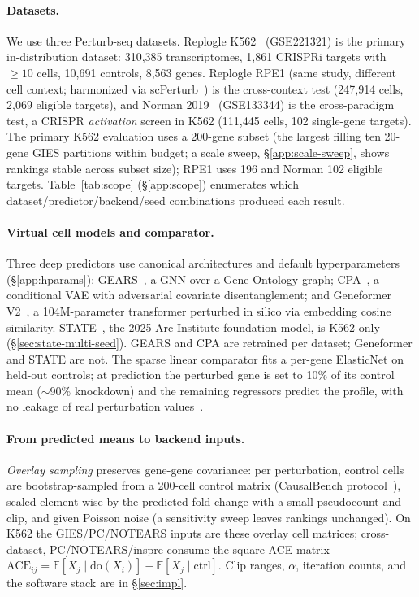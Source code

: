 \documentclass{article}
\theoremstyle{plain}
\theoremstyle{definition}
\theoremstyle{remark}
\begin{document}
\paragraph{Datasets.}
We use three Perturb-seq datasets. Replogle K562~\citep{replogle2022} (GSE221321) is the primary in-distribution dataset: 310{,}385 transcriptomes, 1{,}861 CRISPRi targets with $\geq 10$ cells, 10{,}691 controls, 8{,}563 genes. Replogle RPE1 (same study, different cell context; harmonized via scPerturb~\citep{peidli2024scperturb}) is the cross-context test (247{,}914 cells, 2{,}069 eligible targets), and Norman 2019~\citep{norman2019} (GSE133344) is the cross-paradigm test, a CRISPR \emph{activation} screen in K562 (111{,}445 cells, 102 single-gene targets). The primary K562 evaluation uses a 200-gene subset (the largest filling ten 20-gene GIES partitions within budget; a scale sweep, \S\ref{app:scale-sweep}, shows rankings stable across subset size); RPE1 uses 196 and Norman 102 eligible targets. Table~\ref{tab:scope} (\S\ref{app:scope}) enumerates which dataset/predictor/backend/seed combinations produced each result.

\paragraph{Virtual cell models and comparator.}
Three deep predictors use canonical architectures and default hyperparameters (\S\ref{app:hparams}): GEARS~\citep{roohani2024gears}, a GNN over a Gene Ontology graph; CPA~\citep{lotfollahi2023cpa}, a conditional VAE with adversarial covariate disentanglement; and Geneformer V2~\citep{theodoris2023geneformer}, a 104M-parameter transformer perturbed in silico via embedding cosine similarity. STATE~\citep{adduri2025state,arc2025state}, the 2025 Arc Institute foundation model, is K562-only (\S\ref{sec:state-multi-seed}). GEARS and CPA are retrained per dataset; Geneformer and STATE are not. The sparse linear comparator fits a per-gene ElasticNet on held-out controls; at prediction the perturbed gene is set to 10\% of its control mean ($\sim$90\% knockdown) and the remaining regressors predict the profile, with no leakage of real perturbation values~\citep{zou2005elasticnet}.

\paragraph{From predicted means to backend inputs.}
\emph{Overlay sampling} preserves gene-gene covariance: per perturbation, control cells are bootstrap-sampled from a 200-cell control matrix (CausalBench protocol~\citep{chevalley2025causalbench}), scaled element-wise by the predicted fold change with a small pseudocount and clip, and given Poisson noise (a sensitivity sweep leaves rankings unchanged). On K562 the GIES/PC/NOTEARS inputs are these overlay cell matrices; cross-dataset, PC/NOTEARS/inspre consume the square ACE matrix $\mathrm{ACE}_{ij}=\mathbb{E}[X_j\mid\mathrm{do}(X_i)]-\mathbb{E}[X_j\mid\mathrm{ctrl}]$. Clip ranges, $\alpha$, iteration counts, and the software stack are in \S\ref{sec:impl}.
\end{document}
